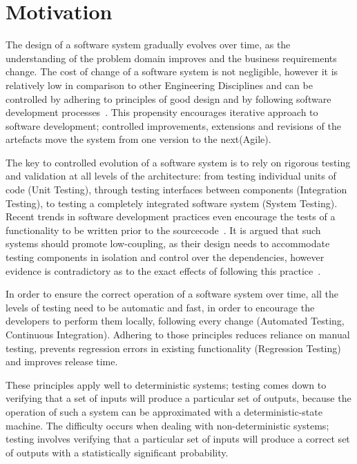 \section{Motivation}
The design of a software system gradually evolves over time, as the understanding of the problem domain improves and the business requirements change. The cost of change of a software system is not negligible, however it is relatively low in comparison to other Engineering Disciplines and can be controlled by adhering to principles of good design and by following software development processes~\cite{Gof1995}. This propensity encourages iterative approach to software development; controlled improvements, extensions and revisions of the artefacts move the system from one version to the next(Agile). 

The key to controlled evolution of a software system is to rely on rigorous testing and validation at all levels of the architecture: from testing individual units of code (Unit Testing), through testing interfaces between components (Integration Testing), to testing a completely integrated software system (System Testing). Recent trends in software development practices even encourage the tests of a functionality to be written prior to the sourcecode~\cite{Beck2001}. It is argued that such systems should promote low-coupling, as their design needs to accommodate testing components in isolation and control over the dependencies, however evidence is contradictory as to the exact effects of following this practice~\cite{Siniaalto2007}.

In order to ensure the correct operation of a software system over time, all the levels of testing need to be automatic and fast, in order to encourage the developers to perform them locally, following every change (Automated Testing, Continuous Integration). Adhering to those principles reduces reliance on manual testing, prevents regression errors in existing functionality (Regression Testing) and improves release time.

These principles apply well to deterministic systems; testing comes down to verifying that a set of inputs will produce a particular set of outputs, because the operation of such a system can be approximated with a deterministic-state machine. The difficulty occurs when dealing with non-deterministic systems; testing involves verifying that a particular set of inputs will produce a correct set of outputs with a statistically significant probability.

